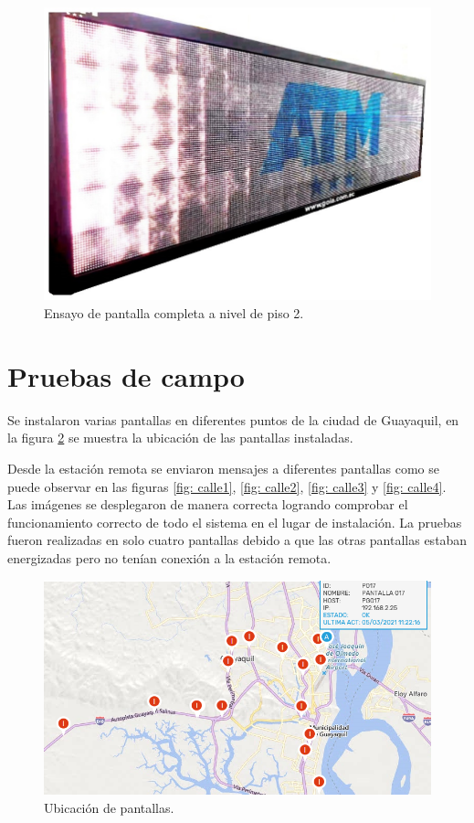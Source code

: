 \begin{figure}[htpb]
	\centering
	\includegraphics[scale=0.6]{Figures/vmsfc8m1.jpg}
	\caption{Ensayo de pantalla completa a nivel de piso 2.}
	\label{fig: pantallacompletasobrepiso2}
\end{figure}
 


\section{Pruebas de campo}

Se instalaron varias pantallas en diferentes puntos de la ciudad de Guayaquil, en la figura \ref{fig: mapa} se muestra la ubicación de las pantallas instaladas.

Desde la estación remota se enviaron mensajes a diferentes pantallas como se puede observar en las figuras \ref{fig: calle1}, \ref{fig: calle2}, \ref{fig: calle3} y \ref{fig: calle4}. Las imágenes se desplegaron de manera correcta logrando comprobar el funcionamiento correcto de todo el sistema en el lugar de instalación.
La pruebas fueron realizadas en solo cuatro pantallas debido a que las otras pantallas estaban energizadas pero no tenían conexión a la estación remota.


\begin{figure}[htpb]
	\centering
	\includegraphics[scale=0.6]{Figures/mapapantallas.png} 
	\caption{Ubicación de pantallas.}
	\label{fig: mapa}
\end{figure}




